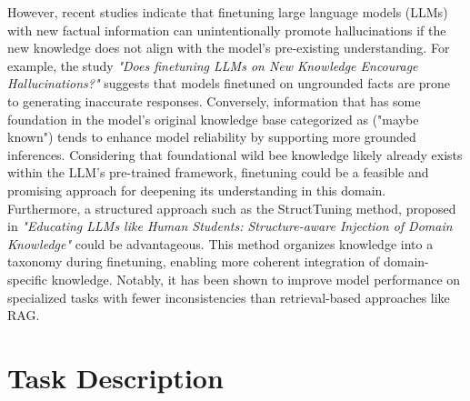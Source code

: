 \documentclass[11pt,a4paper, titlepage=false]{scrreprt}
\begin{document}
However, recent studies indicate that finetuning large language models (LLMs) with new factual information can unintentionally promote hallucinations if the new knowledge does not align with the model's pre-existing understanding. For example, the study \textit{"Does finetuning LLMs on New Knowledge Encourage Hallucinations?"} \cite{gekhman2024doesfinetuningllmsnew} suggests that models finetuned on ungrounded facts are prone to generating inaccurate responses. Conversely, information that has some foundation in the model's original knowledge base  categorized as ("maybe known") tends to enhance model reliability by supporting more grounded inferences. Considering that foundational wild bee knowledge likely already exists within the LLM’s pre-trained framework, finetuning could be a feasible and promising approach for deepening its understanding in this domain.\\ 

Furthermore, a structured approach such as the StructTuning method, proposed in \textit{"Educating LLMs like Human Students: Structure-aware Injection of Domain Knowledge"} \cite{liu2024educatingllmslikehuman} could be advantageous. This method organizes knowledge into a taxonomy during finetuning, enabling more coherent integration of domain-specific knowledge. Notably, it has been shown to improve model performance on specialized tasks with fewer inconsistencies than retrieval-based approaches like RAG.\\

\section*{Task Description}





\end{document}
